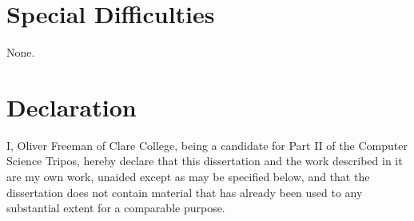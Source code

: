 \section*{Special Difficulties}
None.
 
\newpage
\section*{Declaration}

I, Oliver Freeman of Clare College, being a candidate for Part II of the Computer
Science Tripos, hereby declare that this dissertation and the work described in it are my own work,
unaided except as may be specified below, and that the dissertation
does not contain material that has already been used to any substantial
extent for a comparable purpose.

\bigskip
{}

\medskip
{}